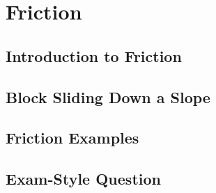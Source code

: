 \documentclass[../alevelmaths.tex]{subfiles}
\begin{document}
\chapter{Friction}
\section{Introduction to Friction}
\section{Block Sliding Down a Slope}
\section{Friction Examples}
\section{Exam-Style Question}
\end{document}

